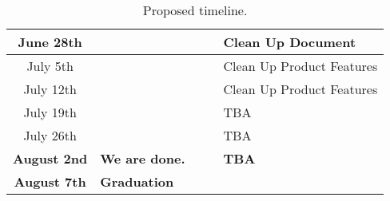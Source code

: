 \begin{table}[h!]
{\begin{tabular}{|S|L|S|L|L|}
      June 28th                     &                       &                                  &                                        & Clean Up Document                    \\ \hline
      July 5th                      &                       &                                  &                                        & Clean Up Product Features            \\ \hline
      July 12th                     &                       &                                  &                                        & Clean Up Product Features            \\ \hline
      July 19th                     &                       &                                  &                                        & TBA                                  \\ \hline
      July 26th                     &                       &                                  &                                        & TBA                                  \\ \hline
      \textbf{August 2nd}           & \textbf{We are done.} & \textbf{}                        & \textbf{}                              & \textbf{TBA}                         \\ \hline
      \textbf{August 7th}           & \textbf{Graduation}   & \textbf{}                        & \textbf{}                              & \textbf{}                            \\ \hline
    \end{tabular}}
  \caption{Proposed timeline.}
  \label{Tab:milestones}
\end{table}
\clearpage
